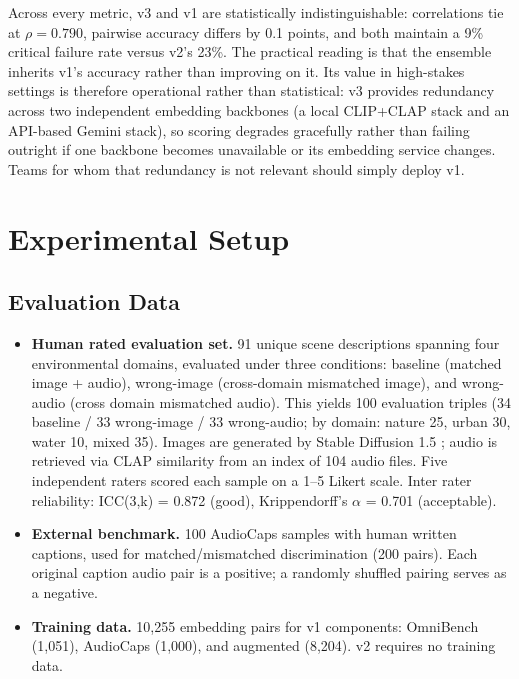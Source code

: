 Across every metric, v3 and v1 are statistically indistinguishable: correlations tie at $\rho = 0.790$, pairwise accuracy differs by 0.1 points, and both maintain a 9\% critical failure rate versus v2's 23\%. The practical reading is that the ensemble inherits v1's accuracy rather than improving on it. Its value in high-stakes settings is therefore operational rather than statistical: v3 provides redundancy across two independent embedding backbones (a local CLIP+CLAP stack and an API-based Gemini stack), so scoring degrades gracefully rather than failing outright if one backbone becomes unavailable or its embedding service changes. Teams for whom that redundancy is not relevant should simply deploy v1.

\section{Experimental Setup}\label{sec:experimental-setup}

\subsection{Evaluation Data}\label{sec:eval-data}

\begin{itemize}

\item \textbf{Human rated evaluation set.}
91 unique scene descriptions spanning four environmental domains, evaluated under three conditions: baseline (matched image + audio), wrong-image (cross-domain mismatched image), and wrong-audio (cross domain mismatched audio). This yields 100 evaluation triples (34 baseline / 33 wrong-image / 33 wrong-audio; by domain: nature 25, urban 30, water 10, mixed 35). Images are generated by Stable Diffusion 1.5 \citep{rombach2022high}; audio is retrieved via CLAP similarity from an index of 104 audio files. Five independent raters scored each sample on a 1--5 Likert scale. Inter rater reliability: ICC(3,k) = 0.872 (good), Krippendorff's $\alpha$ = 0.701 (acceptable).

\item \textbf{External benchmark.}
100 AudioCaps samples \citep{kim2019audiocaps} with human written captions, used for matched/mismatched discrimination (200 pairs). Each original caption audio pair is a positive; a randomly shuffled pairing serves as a negative.

\item \textbf{Training data.}
10,255 embedding pairs for v1 components: OmniBench (1,051), AudioCaps (1,000), and augmented (8,204). v2 requires no training data.

\end{itemize}

